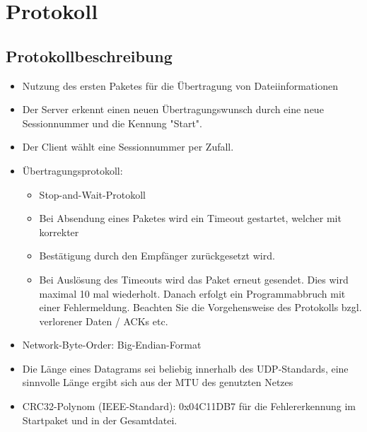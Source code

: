 \documentclass[12pt]{article}
\begin{document}
\pagebreak

\section{Protokoll}
\subsection{Protokollbeschreibung}
\begin{itemize}
\item Nutzung des ersten Paketes für die Übertragung von Dateiinformationen
\item Der Server erkennt einen neuen Übertragungswunsch durch eine neue Sessionnummer und die Kennung "Start".
\item Der Client wählt eine Sessionnummer per Zufall.
\item Übertragungsprotokoll:
\begin{itemize}
\item Stop-and-Wait-Protokoll
\item Bei Absendung eines Paketes wird ein Timeout gestartet, welcher mit korrekter \item Bestätigung durch den Empfänger zurückgesetzt wird.
\item Bei Auslösung des Timeouts wird das Paket erneut gesendet. Dies wird maximal 10 mal wiederholt. Danach erfolgt ein Programmabbruch mit einer Fehlermeldung.
Beachten Sie die Vorgehensweise des Protokolls bzgl. verlorener Daten / ACKs etc.
\end{itemize}
\item Network-Byte-Order: Big-Endian-Format
\item Die Länge eines Datagrams sei beliebig innerhalb des UDP-Standards, eine sinnvolle Länge ergibt sich aus der MTU des genutzten Netzes
\item CRC32-Polynom (IEEE-Standard): 0x04C11DB7 für die Fehlererkennung im Startpaket und in der Gesamtdatei.
\end{itemize}
\end{document}

